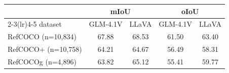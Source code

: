 \begin{tabular}{lcccc}
\toprule
 & \multicolumn{2}{c}{mIoU} & \multicolumn{2}{c}{oIoU} \\
\cmidrule(lr){2-3}\cmidrule(lr){4-5}
dataset & GLM-4.1V & LLaVA & GLM-4.1V & LLaVA \\
\midrule
RefCOCO (n=10,834) & 67.88 & 68.53 & 61.50 & 63.40 \\
RefCOCO+ (n=10,758) & 64.21 & 64.67 & 56.49 & 58.31 \\
RefCOCOg (n=4,896) & 63.82 & 65.12 & 55.41 & 59.77 \\
\bottomrule
\end{tabular}
